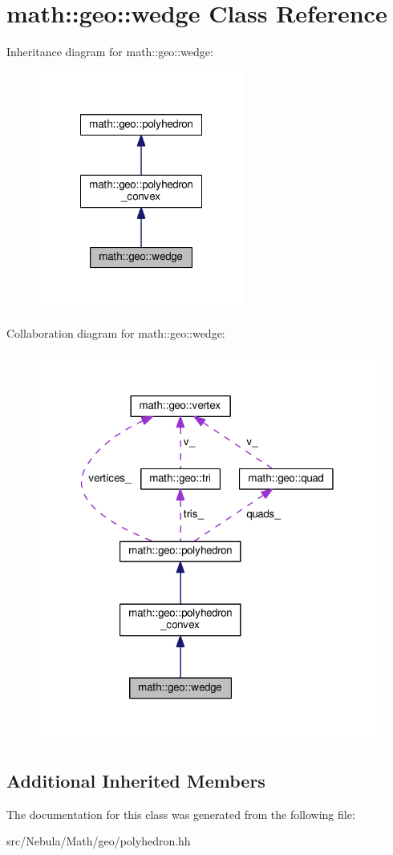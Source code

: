\hypertarget{classmath_1_1geo_1_1wedge}{\section{math\-:\-:geo\-:\-:wedge Class Reference}
\label{classmath_1_1geo_1_1wedge}
}


Inheritance diagram for math\-:\-:geo\-:\-:wedge\-:
\nopagebreak
\begin{figure}[H]
\begin{center}
\leavevmode
\includegraphics[width=192pt]{classmath_1_1geo_1_1wedge__inherit__graph}
\end{center}
\end{figure}


Collaboration diagram for math\-:\-:geo\-:\-:wedge\-:
\nopagebreak
\begin{figure}[H]
\begin{center}
\leavevmode
\includegraphics[width=315pt]{classmath_1_1geo_1_1wedge__coll__graph}
\end{center}
\end{figure}
\subsection*{Additional Inherited Members}


The documentation for this class was generated from the following file\-:\begin{DoxyCompactItemize}
\item 
src/\-Nebula/\-Math/geo/polyhedron.\-hh\end{DoxyCompactItemize}
